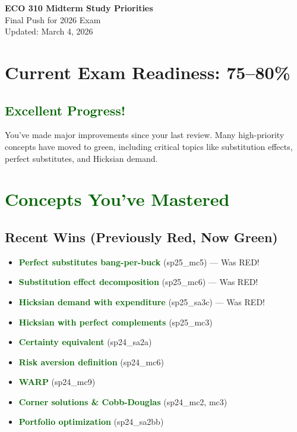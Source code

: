 \documentclass[11pt]{article}
\newcommand{\green}[1]{\textcolor{darkgreen}{\textbf{#1}}}
\begin{document}
\begin{center}
{\LARGE\bfseries ECO 310 Midterm Study Priorities}\\[0.3cm]
{\large Final Push for 2026 Exam}\\[0.2cm]
{\normalsize Updated: March 4, 2026}
\end{center}

\section*{Current Exam Readiness: 75--80\%}

\subsection*{\green{Excellent Progress!}}

You've made major improvements since your last review. Many high-priority concepts have moved to green, including critical topics like substitution effects, perfect substitutes, and Hicksian demand.

\section{\green{Concepts You've Mastered}}

\subsection*{Recent Wins (Previously Red, Now Green)}

\begin{itemize}[leftmargin=*]
    \item \green{Perfect substitutes bang-per-buck} (sp25\_mc5) --- Was RED!
    \item \green{Substitution effect decomposition} (sp25\_mc6) --- Was RED!
    \item \green{Hicksian demand with expenditure} (sp25\_sa3c) --- Was RED!
    \item \green{Hicksian with perfect complements} (sp25\_mc3)
    \item \green{Certainty equivalent} (sp24\_sa2a)
    \item \green{Risk aversion definition} (sp24\_mc6)
    \item \green{WARP} (sp24\_mc9)
    \item \green{Corner solutions \& Cobb-Douglas} (sp24\_mc2, mc3)
    \item \green{Portfolio optimization} (sp24\_sa2bb)
\end{itemize}
\end{document}
